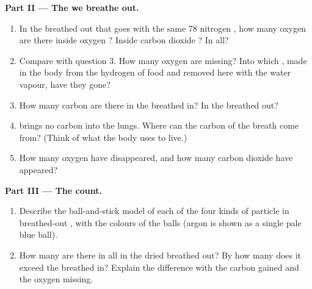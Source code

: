 \begin{problem}
\medskip
\noindent\textbf{Part II --- The  we breathe out.}
\begin{enumerate}[resume]
  \item In the  breathed out that goes with the same 78 nitrogen
        , how many oxygen  are there inside oxygen ?
        Inside carbon dioxide ? In all?
  \item Compare with question 3. How many oxygen  are missing? Into
        which , made in the body from the hydrogen of food and
        removed here with the water vapour, have they gone?
  \item How many carbon  are there in the  breathed in? In the 
        breathed out?
  \item {} brings no carbon  into the lungs. Where can the carbon
         of the breath come from? (Think of what the body uses to
        live.)
  \item How many oxygen  have disappeared, and how many carbon
        dioxide  have appeared?
\end{enumerate}

\medskip
\noindent\textbf{Part III --- The count.}
\begin{enumerate}[resume]
  \item Describe the ball-and-stick model of each of the four kinds of
        particle in breathed-out , with the colours of the balls
        (argon is shown as a single pale blue ball).
  \item How many  are there in all in the dried  breathed out?
        By how many  does it exceed the  breathed in? Explain the
        difference with the carbon  gained and the oxygen 
        missing.
\end{enumerate}
\end{problem}
